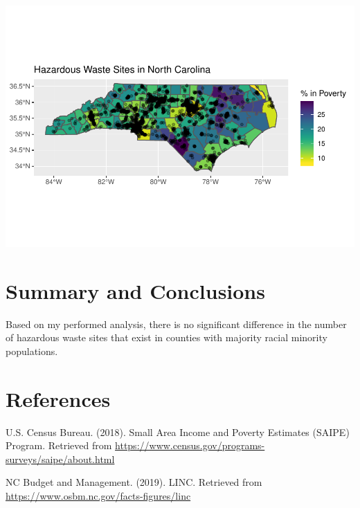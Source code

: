 \documentclass[12pt,]{article}
\begin{document}
\includegraphics{Townsend_Project_Template_files/figure-latex/final visualizations-12.pdf}

\newpage

\section{Summary and Conclusions}\label{summary-and-conclusions}

Based on my performed analysis, there is no significant difference in
the number of hazardous waste sites that exist in counties with majority
racial minority populations.

\newpage

\section{References}\label{references}

U.S. Census Bureau. (2018). Small Area Income and Poverty Estimates
(SAIPE) Program. Retrieved from
\url{https://www.census.gov/programs-surveys/saipe/about.html}

NC Budget and Management. (2019). LINC. Retrieved from
\url{https://www.osbm.nc.gov/facts-figures/linc}
\end{document}
